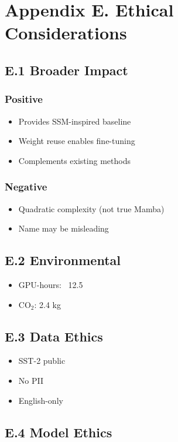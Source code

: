 \section{Appendix E. Ethical Considerations}

\subsection{E.1 Broader Impact}

\subsubsection{Positive}
\begin{itemize}
\item Provides SSM-inspired baseline
\item Weight reuse enables fine-tuning
\item Complements existing methods

\end{itemize}
\subsubsection{Negative}
\begin{itemize}
\item Quadratic complexity (not true Mamba)
\item Name may be misleading

\end{itemize}
\subsection{E.2 Environmental}

\begin{itemize}
\item GPU-hours: ~12.5
\item CO$_2$: 2.4 kg

\end{itemize}
\subsection{E.3 Data Ethics}

\begin{itemize}
\item SST-2 public
\item No PII
\item English-only

\end{itemize}
\subsection{E.4 Model Ethics}

